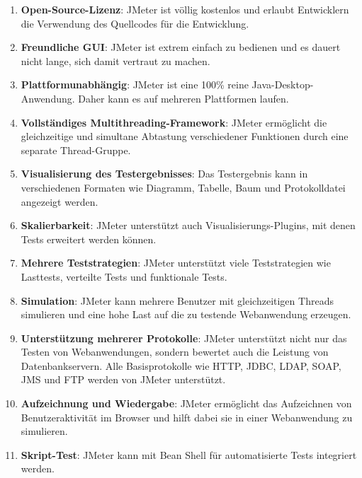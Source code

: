 \begin{enumerate}

    \item \textbf{Open-Source-Lizenz}: JMeter ist völlig kostenlos und erlaubt
     Entwicklern die Verwendung des Quellcodes für die Entwicklung.

    \item \textbf{Freundliche GUI}: JMeter ist extrem einfach zu bedienen und es
    dauert nicht lange, sich damit vertraut zu machen.

    \item \textbf{Plattformunabhängig}: JMeter ist eine 100\% reine
    Java-Desktop-Anwendung. Daher kann es auf mehreren Plattformen laufen.

    \item \textbf{Vollständiges Multithreading-Framework}: JMeter ermöglicht die
    gleichzeitige und simultane Abtastung verschiedener Funktionen durch
    eine separate Thread-Gruppe.

    \item \textbf{Visualisierung des Testergebnisses}: Das Testergebnis kann in
    verschiedenen Formaten wie Diagramm, Tabelle, Baum und Protokolldatei
    angezeigt werden.

    \item \textbf{Skalierbarkeit}: JMeter  unterstützt auch Visualisierungs-Plugins,
    mit denen Tests erweitert werden können.

    \item \textbf{Mehrere Teststrategien}: JMeter unterstützt viele
    Teststrategien wie Lasttests, verteilte Tests und funktionale Tests.

    \item \textbf{Simulation}: JMeter kann mehrere Benutzer mit gleichzeitigen Threads
    simulieren und eine hohe Last auf die zu testende Webanwendung erzeugen.

    \item \textbf{Unterstützung mehrerer Protokolle}: JMeter unterstützt nicht
    nur das Testen von Webanwendungen, sondern bewertet auch die
    Leistung von Datenbankservern. Alle Basisprotokolle wie HTTP, JDBC,
    LDAP, SOAP, JMS und FTP werden von JMeter unterstützt.

    \item \textbf{Aufzeichnung und Wiedergabe}: JMeter ermöglicht das Aufzeichnen
    von Benutzeraktivität im Browser und hilft dabei sie in einer
    Webanwendung zu simulieren.

    \item \textbf{Skript-Test}: JMeter kann mit Bean Shell für automatisierte Tests
    integriert werden.

\end{enumerate}

